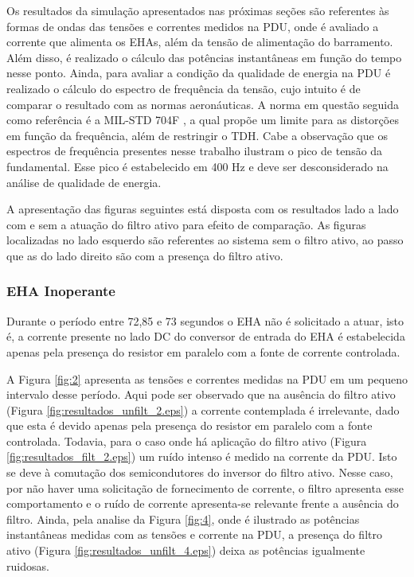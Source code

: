 Os resultados da simulação apresentados nas próximas seções são referentes às formas de ondas das tensões e correntes medidos na PDU, onde é avaliado a corrente que alimenta os EHAs, além da tensão de alimentação do barramento. Além disso, é realizado o cálculo das potências instantâneas em função do tempo nesse ponto. Ainda, para avaliar a condição da qualidade de energia na PDU é realizado o cálculo do espectro de frequência da tensão, cujo intuito é de comparar o resultado com as normas aeronáuticas. A norma em questão seguida como referência é a MIL-STD 704F \cite{MILSTD}, a qual propõe um limite para as distorções em função da frequência, além de restringir o TDH. Cabe a observação que os espectros de frequência presentes nesse trabalho ilustram o pico de tensão da fundamental. Esse pico é estabelecido em 400 Hz e deve ser desconsiderado na análise de qualidade de energia.

A apresentação das figuras seguintes está disposta com os resultados lado a lado com e sem a atuação do filtro ativo para efeito de comparação. As figuras localizadas no lado esquerdo são referentes ao sistema sem o filtro ativo, ao passo que as do lado direito são com a presença do filtro ativo.

\subsubsection{EHA Inoperante}

Durante o período entre 72,85 e 73 segundos o EHA não é solicitado a atuar, isto é, a corrente presente no lado DC do conversor de entrada do EHA é estabelecida apenas pela presença do resistor em paralelo com a fonte de corrente controlada. 

A Figura \ref{fig:2} apresenta as tensões e correntes medidas na PDU em um pequeno intervalo desse período. Aqui pode ser observado que na ausência do filtro ativo (Figura \ref{fig:resultados_unfilt_2.eps}) a corrente contemplada é irrelevante, dado que esta é devido apenas pela presença do resistor em paralelo com a fonte controlada. Todavia, para o caso onde há aplicação do filtro ativo (Figura \ref{fig:resultados_filt_2.eps}) um ruído intenso é medido na corrente da PDU. Isto se deve à comutação dos semicondutores do inversor do filtro ativo. Nesse caso, por não haver uma solicitação de fornecimento de corrente, o filtro apresenta esse comportamento e o ruído de corrente apresenta-se relevante frente a ausência do filtro. Ainda, pela analise da Figura \ref{fig:4}, onde é ilustrado as potências instantâneas medidas com as tensões e corrente na PDU, a presença do filtro ativo (Figura \ref{fig:resultados_unfilt_4.eps}) deixa as potências igualmente ruidosas.

